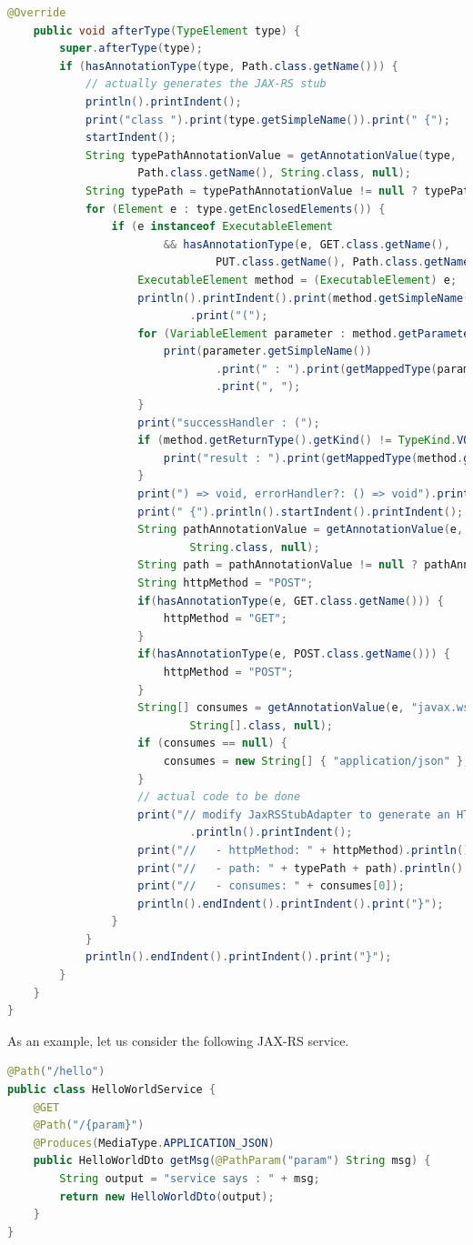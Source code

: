 \documentclass[a4paper]{report}
\begin{document}
\begin{lstlisting}[language=Java]
	@Override
	public void afterType(TypeElement type) {
		super.afterType(type);
		if (hasAnnotationType(type, Path.class.getName())) {
			// actually generates the JAX-RS stub
			println().printIndent();
			print("class ").print(type.getSimpleName()).print(" {");
			startIndent();
			String typePathAnnotationValue = getAnnotationValue(type, 
					Path.class.getName(), String.class, null);
			String typePath = typePathAnnotationValue != null ? typePathAnnotationValue : "";
			for (Element e : type.getEnclosedElements()) {
				if (e instanceof ExecutableElement
						&& hasAnnotationType(e, GET.class.getName(), 
								PUT.class.getName(), Path.class.getName())) {
					ExecutableElement method = (ExecutableElement) e;
					println().printIndent().print(method.getSimpleName().toString())
							.print("(");
					for (VariableElement parameter : method.getParameters()) {
						print(parameter.getSimpleName())
								.print(" : ").print(getMappedType(parameter.asType()))
								.print(", ");
					}
					print("successHandler : (");
					if (method.getReturnType().getKind() != TypeKind.VOID) {
						print("result : ").print(getMappedType(method.getReturnType()));
					}
					print(") => void, errorHandler?: () => void").print(") : void");
					print(" {").println().startIndent().printIndent();
					String pathAnnotationValue = getAnnotationValue(e, Path.class.getName(), 
							String.class, null);
					String path = pathAnnotationValue != null ? pathAnnotationValue : "";
					String httpMethod = "POST";
					if(hasAnnotationType(e, GET.class.getName())) {
						httpMethod = "GET";
					}
					if(hasAnnotationType(e, POST.class.getName())) {
						httpMethod = "POST";
					}
					String[] consumes = getAnnotationValue(e, "javax.ws.rs.Consumes", 
							String[].class, null);
					if (consumes == null) {
						consumes = new String[] { "application/json" };
					}
					// actual code to be done
					print("// modify JaxRSStubAdapter to generate an HTTP invocation here")
							.println().printIndent();
					print("//   - httpMethod: " + httpMethod).println().printIndent();
					print("//   - path: " + typePath + path).println().printIndent();
					print("//   - consumes: " + consumes[0]);
					println().endIndent().printIndent().print("}");
				}
			}
			println().endIndent().printIndent().print("}");
		}
	}
}
\end{lstlisting}

As an example, let us consider the following JAX-RS service.

\begin{lstlisting}[language=Java]
@Path("/hello")
public class HelloWorldService {
	@GET
	@Path("/{param}")
	@Produces(MediaType.APPLICATION_JSON)
	public HelloWorldDto getMsg(@PathParam("param") String msg) {
		String output = "service says : " + msg;
		return new HelloWorldDto(output);
	}
}
\end{lstlisting}
\end{document}
